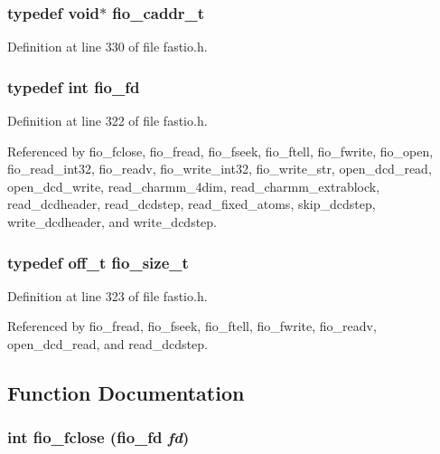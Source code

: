 \subsubsection{\setlength{\rightskip}{0pt plus 5cm}typedef void$\ast$ fio\_\-caddr\_\-t}\label{fastio_8h_a7}




Definition at line 330 of file fastio.h.
\subsubsection{\setlength{\rightskip}{0pt plus 5cm}typedef int fio\_\-fd}\label{fastio_8h_a5}




Definition at line 322 of file fastio.h.

Referenced by fio\_\-fclose, fio\_\-fread, fio\_\-fseek, fio\_\-ftell, fio\_\-fwrite, fio\_\-open, fio\_\-read\_\-int32, fio\_\-readv, fio\_\-write\_\-int32, fio\_\-write\_\-str, open\_\-dcd\_\-read, open\_\-dcd\_\-write, read\_\-charmm\_\-4dim, read\_\-charmm\_\-extrablock, read\_\-dcdheader, read\_\-dcdstep, read\_\-fixed\_\-atoms, skip\_\-dcdstep, write\_\-dcdheader, and write\_\-dcdstep.
\subsubsection{\setlength{\rightskip}{0pt plus 5cm}typedef off\_\-t fio\_\-size\_\-t}\label{fastio_8h_a6}




Definition at line 323 of file fastio.h.

Referenced by fio\_\-fread, fio\_\-fseek, fio\_\-ftell, fio\_\-fwrite, fio\_\-readv, open\_\-dcd\_\-read, and read\_\-dcdstep.

\subsection{Function Documentation}
\subsubsection{\setlength{\rightskip}{0pt plus 5cm}int fio\_\-fclose ({\bf fio\_\-fd} {\em fd})\hspace{0.3cm}{\tt  [static]}}\label{fastio_8h_a9}




